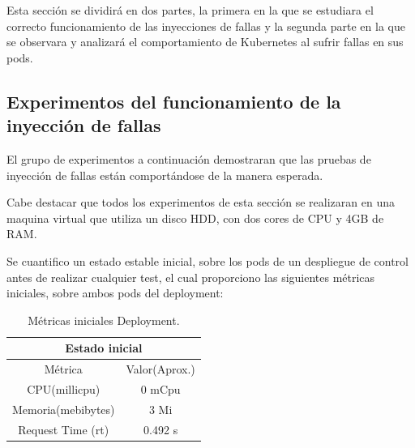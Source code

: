 \par Esta sección se dividirá en dos partes, la primera en la que se estudiara el correcto funcionamiento de las inyecciones de fallas y la segunda parte en la que se observara y analizará el comportamiento de Kubernetes al sufrir fallas en sus pods.\\

\subsection{Experimentos del funcionamiento de la inyección de fallas}





\par El grupo de experimentos a continuación demostraran que las pruebas de inyección de fallas están comportándose de la manera esperada.\\ 

\par Cabe destacar que todos los experimentos de esta sección se realizaran en una maquina virtual que utiliza un disco HDD, con dos cores de CPU y 4GB de RAM.\\

\par Se cuantifico un estado estable inicial, sobre los pods de un despliegue de control antes de realizar cualquier test, el cual proporciono las siguientes métricas iniciales, sobre ambos pods del deployment:
\begin{table}[ht!]
\begin{center}
\begin{tabular}{ |c|c| } 
 \hline
 \multicolumn{2}{|c|}{Estado inicial} \\
 \hline
 \hline
 Métrica & Valor(Aprox.)\\
 \hline
 CPU(millicpu) & 0 mCpu\\
 Memoria(mebibytes) & 3 Mi \\
 Request Time (rt) & 0.492 s\\
 \hline
\end{tabular}
\end{center}
\caption{Métricas iniciales Deployment.}
\label{tab:tabla40}
\end{table}

